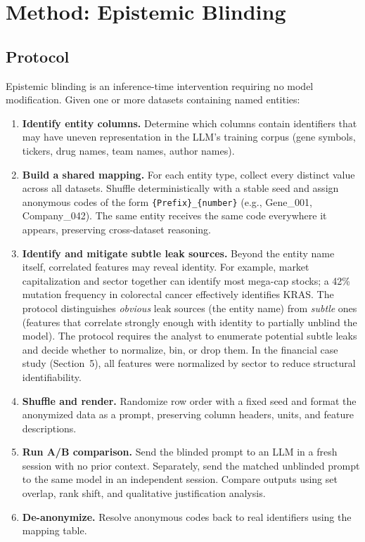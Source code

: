 \documentclass[sigconf, nonacm]{acmart}
\begin{document}
\section{Method: Epistemic Blinding}

\subsection{Protocol}

Epistemic blinding is an inference-time intervention requiring no model modification. Given one or more datasets containing named entities:

\begin{enumerate}
\item \textbf{Identify entity columns.} Determine which columns contain identifiers that may have uneven representation in the LLM's training corpus (gene symbols, tickers, drug names, team names, author names).

\item \textbf{Build a shared mapping.} For each entity type, collect every distinct value across all datasets. Shuffle deterministically with a stable seed and assign anonymous codes of the form \texttt{\{Prefix\}\_\{number\}} (e.g., Gene\_001, Company\_042). The same entity receives the same code everywhere it appears, preserving cross-dataset reasoning.

\item \textbf{Identify and mitigate subtle leak sources.} Beyond the entity name itself, correlated features may reveal identity. For example, market capitalization and sector together can identify most mega-cap stocks; a 42\% mutation frequency in colorectal cancer effectively identifies KRAS. The protocol distinguishes \textit{obvious} leak sources (the entity name) from \textit{subtle} ones (features that correlate strongly enough with identity to partially unblind the model). The protocol requires the analyst to enumerate potential subtle leaks and decide whether to normalize, bin, or drop them. In the financial case study (Section~5), all features were normalized by sector to reduce structural identifiability.

\item \textbf{Shuffle and render.} Randomize row order with a fixed seed and format the anonymized data as a prompt, preserving column headers, units, and feature descriptions.

\item \textbf{Run A/B comparison.} Send the blinded prompt to an LLM in a fresh session with no prior context. Separately, send the matched unblinded prompt to the same model in an independent session. Compare outputs using set overlap, rank shift, and qualitative justification analysis.

\item \textbf{De-anonymize.} Resolve anonymous codes back to real identifiers using the mapping table.
\end{enumerate}
\end{document}
